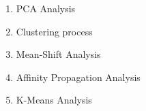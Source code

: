 \begin{enumerate}
\item PCA Analysis
\item Clustering process
\item Mean-Shift Analysis 
\item Affinity Propagation Analysis 
\item K-Means Analysis
\end{enumerate}
